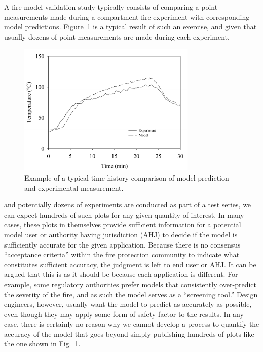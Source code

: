 A fire model validation study typically consists of comparing a point measurements made during a compartment fire experiment with corresponding model predictions.
Figure~\ref{temp_history} is a typical result of such an exercise, and given that usually dozens of point measurements are made during each experiment,
\begin{figure}[ht]
\begin{center}
\includegraphics[height=2.5in]{FIGURES/sample_time_history}
\end{center}
\caption[Sample time history plots.]{Example of a typical time history comparison of model prediction and experimental measurement.}
\label{temp_history}
\end{figure}
and potentially dozens of experiments are conducted as part of a test series, we can expect hundreds of such plots for any given quantity of interest. In many cases, these
plots in themselves provide sufficient information for a potential model user or authority having jurisdiction (AHJ) to decide if the model is sufficiently accurate for the
given application. Because there is no consensus ``acceptance criteria'' within the fire protection community to indicate what constitutes sufficient accuracy, the
judgment is left to end user or AHJ. It can be argued that this is as it should be because each application is different. For example, some regulatory
authorities prefer models that consistently over-predict the severity of the fire, and as such the model serves as a ``screening tool.'' Design engineers, however,
usually want the model to predict as accurately as possible, even though they may apply some form of safety factor to the results.
In any case, there is certainly no reason why we cannot develop a process to quantify the accuracy of the model that goes beyond simply
publishing hundreds of plots like the one shown in Fig.~\ref{temp_history}.

